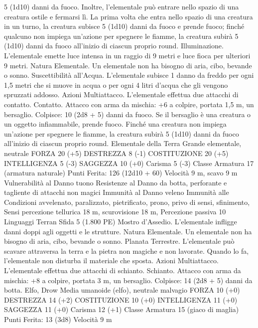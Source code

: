 \begin{multicols}{2}
5 (1d10) danni da fuoco. Inoltre, l’elementale può entrare nello
spazio di una creatura ostile e fermarsi lì. La prima volta che
entra nello spazio di una creatura in un turno, la creatura subisce
5 (1d10) danni da fuoco e prende fuoco; finché qualcuno non
impiega un’azione per spegnere le fiamme, la creatura subirà 5
(1d10) danni da fuoco all’inizio di ciascun proprio round.
Illuminazione. L’elementale emette luce intensa in un raggio di
9 metri e luce fioca per ulteriori 9 metri.
Natura Elementale. Un elementale non ha bisogno di aria, cibo,
bevande o sonno.
Suscettibilità all’Acqua. L’elementale subisce 1 danno da freddo
per ogni 1,5 metri che si muove in acqua o per ogni 4 litri
d’acqua che gli vengono spruzzati addosso.
Azioni
Multiattacco. L’elementale effettua due attacchi di contatto.
Contatto. Attacco con arma da mischia: +6 a colpire, portata 1,5
m, un bersaglio.
Colpisce: 10 (2d8 + 5) danni da fuoco. Se il bersaglio è una
creatura o un oggetto infiammabile, prende fuoco. Finché una
creatura non impiega un’azione per spegnere le fiamme, la
creatura subirà 5 (1d10) danni da fuoco all’inizio di ciascun
proprio round.
Elementale della Terra
Grande elementale, neutrale
FORZA 20 (+5)
DESTREZZA 8 (-1)
COSTITUZIONE 20 (+5)
INTELLIGENZA 5 (-3)
SAGGEZZA 10 (+0)
Carisma 5 (-3)
Classe Armatura 17 (armatura naturale)
\hspace*{0pt}\hfill{Punti Ferita}: 126 (12d10 + 60)
Velocità 9 m, scavo 9 m
Vulnerabilità al Danno tuono
Resistenze al Danno da botta, perforante e tagliente di
attacchi non magici
Immunità al Danno veleno
Immunità alle Condizioni avvelenato, paralizzato, pietrificato,
prono, privo di sensi, sfinimento,
Sensi percezione tellurica 18 m, scurovisione 18 m, Percezione
passiva 10
Linguaggi Terran
Sfida 5 (1.800 PE)
Mostro d’Assedio. L’elementale infligge danni doppi agli oggetti
e le strutture.
Natura Elementale. Un elementale non ha bisogno di aria, cibo,
bevande o sonno.
Planata Terrestre. L’elementale può scavare attraversa la terra e
la pietra non magiche e non lavorate. Quando lo fa, l’elementale
non disturba il materiale che sposta.
Azioni
Multiattacco. L’elementale effettua due attacchi di schianto.
Schianto. Attacco con arma da mischia: +8 a colpire, portata 3
m, un bersaglio.
Colpisce: 14 (2d8 + 5) danni da botta.
Elfo, Drow
Media umanoide (elfo), neutrale malvagio
FORZA 10 (+0)
DESTREZZA 14 (+2)
COSTITUZIONE 10 (+0)
INTELLIGENZA 11 (+0)
SAGGEZZA 11 (+0)
Carisma 12 (+1)
Classe Armatura 15 (giaco di maglia)
\hspace*{0pt}\hfill{Punti Ferita}: 13 (3d8)
Velocità 9 m

\end{multicols}
